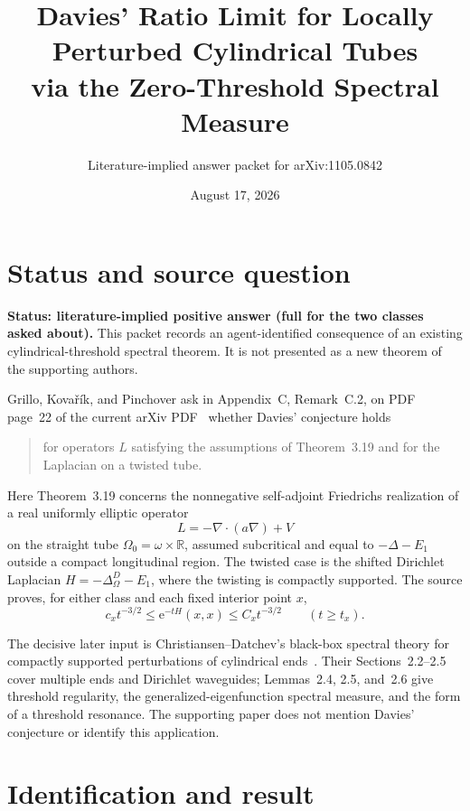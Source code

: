 \documentclass[11pt]{article}
\title{Davies' Ratio Limit for Locally Perturbed Cylindrical Tubes\\
via the Zero-Threshold Spectral Measure}
\author{Literature-implied answer packet for arXiv:1105.0842}
\date{August 17, 2026}
\newcommand{\R}{\mathbb R}
\newcommand{\ee}{\mathrm e}
\begin{document}
\maketitle

\section{Status and source question}

\textbf{Status: literature-implied positive answer (full for the two classes
asked about).}  This packet records an agent-identified consequence of an
existing cylindrical-threshold spectral theorem.  It is not presented as a
new theorem of the supporting authors.

Grillo, Kova\v{r}\'ik, and Pinchover ask in Appendix~C, Remark~C.2, on PDF
page~22 of the current arXiv PDF~\cite{GKP} whether Davies' conjecture holds

\begin{quote}
for operators \(L\) satisfying the assumptions of Theorem~3.19 and for the
Laplacian on a twisted tube.
\end{quote}

Here Theorem~3.19 concerns the nonnegative self-adjoint Friedrichs realization
of a real uniformly elliptic operator
\[
 L=-\nabla\!\cdot(a\nabla)+V
\]
on the straight tube \(\Omega_0=\omega\times\R\), assumed subcritical and
equal to \(-\Delta-E_1\) outside a compact longitudinal region.  The twisted
case is the shifted Dirichlet Laplacian
\(H=-\Delta^D_\Omega-E_1\), where the twisting is compactly supported.
The source proves, for either class and each fixed interior point \(x\),
\begin{equation}\label{eq:diag}
 c_x t^{-3/2}\leq \ee^{-tH}(x,x)\leq C_x t^{-3/2}
 \qquad(t\geq t_x).
\end{equation}

The decisive later input is Christiansen--Datchev's black-box spectral theory
for compactly supported perturbations of cylindrical ends~\cite{CD}.  Their
Sections~2.2--2.5 cover multiple ends and Dirichlet waveguides; Lemmas~2.4,
2.5, and~2.6 give threshold regularity, the generalized-eigenfunction spectral
measure, and the form of a threshold resonance.  The supporting paper does
not mention Davies' conjecture or identify this application.

\section{Identification and result}
\end{document}
